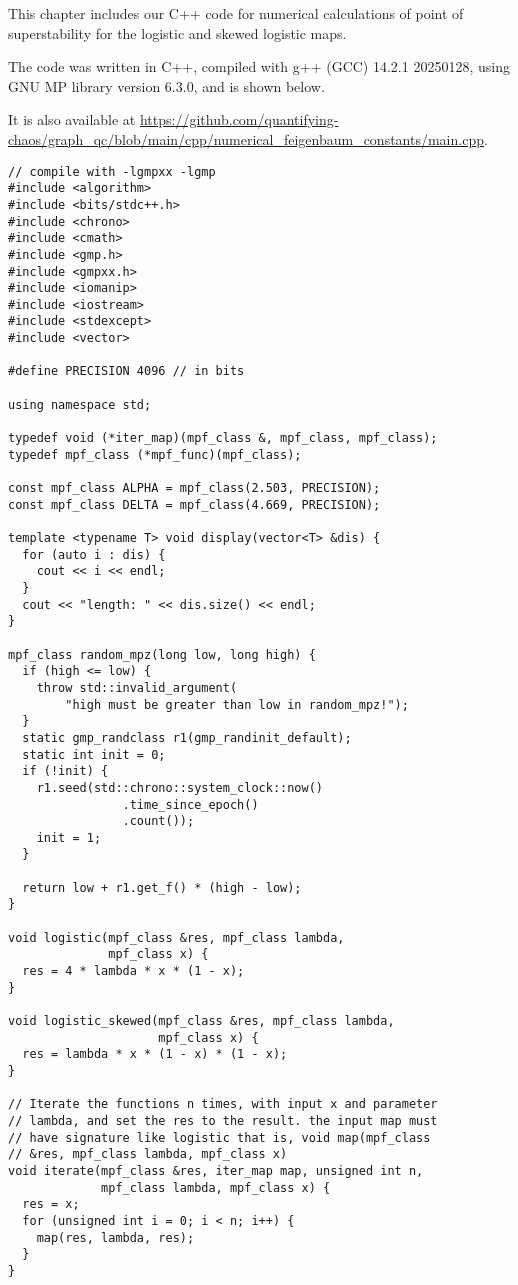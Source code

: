 This chapter includes our C++ code for numerical calculations of point of superstability for the logistic and skewed logistic maps.

The code was written in C++, compiled with g++ (GCC) 14.2.1 20250128, using GNU MP library version 6.3.0, and is shown below. 

It is also available at \url{https://github.com/quantifying-chaos/graph_qc/blob/main/cpp/numerical_feigenbaum_constants/main.cpp}.

\begin{lstlisting}[style=cppstyle]
// compile with -lgmpxx -lgmp
#include <algorithm>
#include <bits/stdc++.h>
#include <chrono>
#include <cmath>
#include <gmp.h>
#include <gmpxx.h>
#include <iomanip>
#include <iostream>
#include <stdexcept>
#include <vector>

#define PRECISION 4096 // in bits

using namespace std;

typedef void (*iter_map)(mpf_class &, mpf_class, mpf_class);
typedef mpf_class (*mpf_func)(mpf_class);

const mpf_class ALPHA = mpf_class(2.503, PRECISION);
const mpf_class DELTA = mpf_class(4.669, PRECISION);

template <typename T> void display(vector<T> &dis) {
  for (auto i : dis) {
    cout << i << endl;
  }
  cout << "length: " << dis.size() << endl;
}

mpf_class random_mpz(long low, long high) {
  if (high <= low) {
    throw std::invalid_argument(
        "high must be greater than low in random_mpz!");
  }
  static gmp_randclass r1(gmp_randinit_default);
  static int init = 0;
  if (!init) {
    r1.seed(std::chrono::system_clock::now()
                .time_since_epoch()
                .count());
    init = 1;
  }

  return low + r1.get_f() * (high - low);
}

void logistic(mpf_class &res, mpf_class lambda,
              mpf_class x) {
  res = 4 * lambda * x * (1 - x);
}

void logistic_skewed(mpf_class &res, mpf_class lambda,
                     mpf_class x) {
  res = lambda * x * (1 - x) * (1 - x);
}

// Iterate the functions n times, with input x and parameter
// lambda, and set the res to the result. the input map must
// have signature like logistic that is, void map(mpf_class
// &res, mpf_class lambda, mpf_class x)
void iterate(mpf_class &res, iter_map map, unsigned int n,
             mpf_class lambda, mpf_class x) {
  res = x;
  for (unsigned int i = 0; i < n; i++) {
    map(res, lambda, res);
  }
}


\end{lstlisting}

